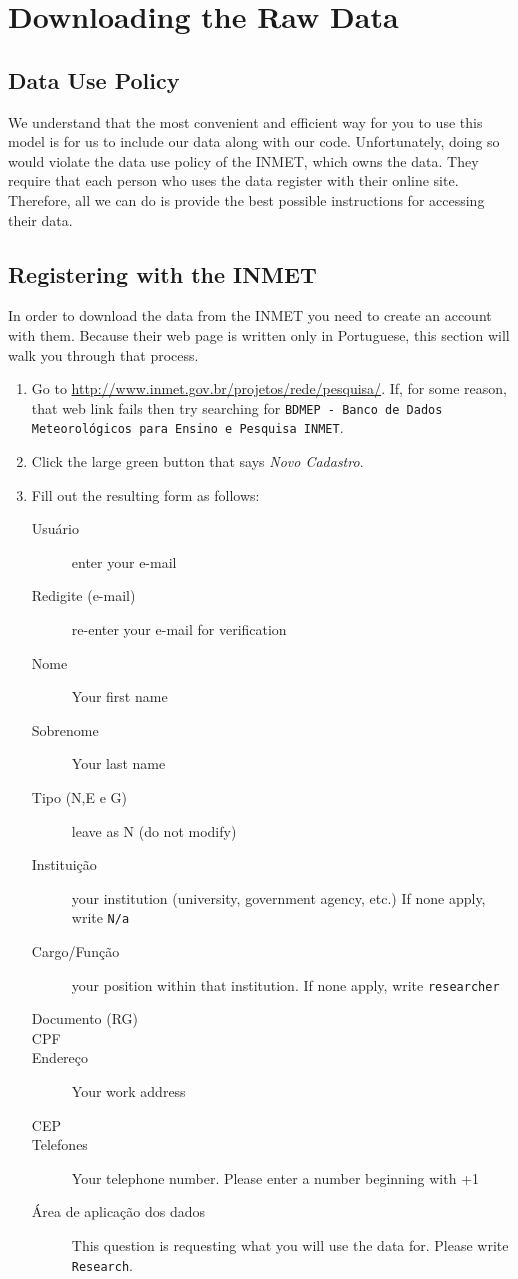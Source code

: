 \documentclass[11pt]{article} %
\newcommand{\code}[1]{\texttt{#1}} %
\newcommand{\usee}[1]{\textit{#1}} %
\begin{document}
\section{Downloading the Raw Data} \label{dload}

\subsection{Data Use Policy}
We understand that the most convenient and efficient way for you to use this model is for us to include our data along with our code.
Unfortunately, doing so would violate the data use policy of the \ac{INMET}, which owns the data.
They require that each person who uses the data register with their online site.
Therefore, all we can do is provide the best possible instructions for accessing their data.

\subsection{Registering with the \acs{INMET}} \label{register}
In order to download the data from the \ac{INMET} you need to create an account with them.
Because their web page is written only in Portuguese, this section will walk you through that process.

\begin{enumerate}
\item Go to \url{http://www.inmet.gov.br/projetos/rede/pesquisa/}. If, for some reason, that web link fails then try searching for \code{BDMEP - Banco de Dados Meteorol\'{o}gicos para Ensino e Pesquisa INMET}.
\item Click the large green button that says \usee{Novo Cadastro}.
\item Fill out the resulting form as follows:

\begin{description}
\item[Usu\'{a}rio] enter your e-mail	
\item[Redigite (e-mail)] re-enter your e-mail for verification
\item[Nome] Your first name
\item[Sobrenome] Your last name
\item[Tipo (N,E e G)] leave as N (do not modify)
\item[Institui\c{c}\~{a}o] your institution (university, government agency, etc.) If none apply, write \code{N/a}
\item[Cargo/Fun\c{c}\~{a}o] your position within that institution. If none apply, write \code{researcher}
\item[Documento (RG)]
\item[CPF]
\item[Endere\c{c}o] Your work address
\item[CEP]
\item[Telefones] Your telephone number. Please enter a number beginning with +1
\item[\'{A}rea de aplica\c{c}\~{a}o dos dados] This question is requesting what you will use the data for. Please write \code{Research}. 
\end{description}

\end{enumerate}
\end{document}
